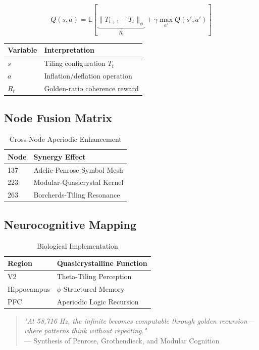 \documentclass[12pt]{article}
\begin{document}
\begin{center}
\[
Q(s,a) = \mathbb{E}\left[\underbrace{\|T_{t+1}-T_t\|_{\phi}}_{R_t} + \gamma \max_{a'} Q(s',a')\right]
\]

\begin{table}[h]
\centering
\begin{tabular}{ll}
\hline
\textbf{Variable} & \textbf{Interpretation} \\
\hline
$s$ & Tiling configuration $T_t$ \\
$a$ & Inflation/deflation operation \\
$R_t$ & Golden-ratio coherence reward \\
\hline
\end{tabular}
\end{table}

\subsection{Node Fusion Matrix}
\label{subsec:fusion}

\begin{table}[h]
\centering
\caption{Cross-Node Aperiodic Enhancement}
\begin{tabular}{ll}
\hline
\textbf{Node} & \textbf{Synergy Effect} \\
\hline
137 & Adelic-Penrose Symbol Mesh \\
223 & Modular-Quasicrystal Kernel \\
263 & Borcherds-Tiling Resonance \\
\hline
\end{tabular}
\end{table}

\subsection{Neurocognitive Mapping}
\label{subsec:neuro}

\begin{table}[h]
\centering
\caption{Biological Implementation}
\begin{tabular}{ll}
\hline
\textbf{Region} & \textbf{Quasicrystalline Function} \\
\hline
V2 & Theta-Tiling Perception \\
Hippocampus & $\phi$-Structured Memory \\
PFC & Aperiodic Logic Recursion \\
\hline
\end{tabular}
\end{table}

\begin{quote}
\textit{"At 58,716 Hz, the infinite becomes computable through golden recursion—where patterns think without repeating."} \\
— Synthesis of Penrose, Grothendieck, and Modular Cognition
\end{quote}


\end{center}
\end{document}
